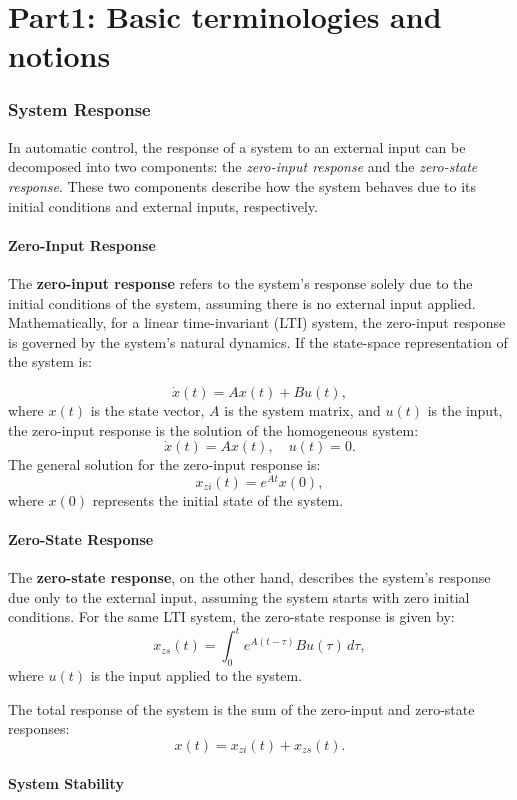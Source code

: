 \chapter{Part1: Basic terminologies and notions}

\subsection{System Response}
In automatic control, the response of a system to an external input can be decomposed into two components: the \textit{zero-input response} and the \textit{zero-state response}. These two components describe how the system behaves due to its initial conditions and external inputs, respectively.

\subsubsection{Zero-Input Response}
The \textbf{zero-input response} refers to the system's response solely due to the initial conditions of the system, assuming there is no external input applied. Mathematically, for a linear time-invariant (LTI) system, the zero-input response is governed by the system's natural dynamics. If the state-space representation of the system is:

\[
\dot{x}(t) = Ax(t) + Bu(t),
\]
where \(x(t)\) is the state vector, \(A\) is the system matrix, and \(u(t)\) is the input, the zero-input response is the solution of the homogeneous system:
\[
\dot{x}(t) = Ax(t), \quad u(t) = 0.
\]
The general solution for the zero-input response is:
\[
x_{zi}(t) = e^{At}x(0),
\]
where \(x(0)\) represents the initial state of the system.

\subsubsection{Zero-State Response}
The \textbf{zero-state response}, on the other hand, describes the system's response due only to the external input, assuming the system starts with zero initial conditions. For the same LTI system, the zero-state response is given by:
\[
x_{zs}(t) = \int_0^t e^{A(t-\tau)}Bu(\tau) \, d\tau,
\]
where \(u(t)\) is the input applied to the system.

The total response of the system is the sum of the zero-input and zero-state responses:
\[
x(t) = x_{zi}(t) + x_{zs}(t).
\]

\subsubsection{System Stability}

